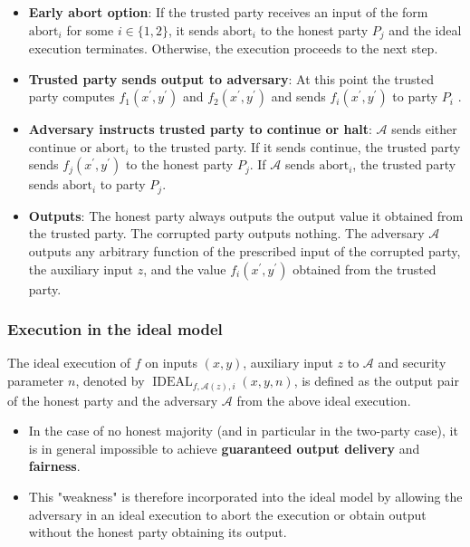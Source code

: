 \documentclass{beamer}
\begin{document}
    \begin{frame}
    
        \begin{definition}
            \begin{itemize}
                \item \textbf{Early abort option}: If the trusted party receives an input of the form $\mathrm{abort}_{i}$ for some $i \in\{1,2\}$, it sends $\mathrm{abort}_{i}$ to the honest party $P_{j}$ and the ideal execution terminates. Otherwise, the execution proceeds to the next step.
                \item \textbf{Trusted party sends output to adversary}: At this point the trusted party computes $f_{1}\left(x^{\prime}, y^{\prime}\right)$ and $f_{2}\left(x^{\prime}, y^{\prime}\right)$ and sends $f_{i}\left(x^{\prime}, y^{\prime}\right)$ to party $P_{i}$ .
                \item \textbf{Adversary instructs trusted party to continue or halt}: $\mathcal{A}$ sends either $\mathrm{continue}$ or $\mathrm{abort}_{i}$ to the trusted party. If it sends $\mathrm{continue}$, the trusted party sends $f_{j}\left(x^{\prime}, y^{\prime}\right)$ to the honest party $P_{j}$. If $\mathcal{A}$ sends $\mathrm{abort}_{i}$, the trusted party sends $\mathrm{abort}_{i}$ to party $P_{j}$.
                \item \textbf{Outputs}: The honest party always outputs the output value it obtained from the trusted party. The corrupted party outputs nothing. The adversary $\mathcal{A}$ outputs any arbitrary function of the prescribed input of the corrupted party, the auxiliary input $z$, and the value $f_{i}\left(x^{\prime}, y^{\prime}\right)$ obtained from the trusted party.

            \end{itemize}
        \end{definition}
    
    \end{frame}
    \begin{frame}
        \frametitle{Execution in the ideal model}
        
        \begin{definition}
            The ideal execution of $f$ on inputs $(x, y)$, auxiliary input $z$ to $\mathcal{A}$ and security parameter $n$, denoted by $\operatorname{IDEAL}_{f, \mathcal{A}(z), i}(x, y, n)$, is defined as the output pair of the honest party and the adversary $\mathcal{A}$ from the above ideal execution.
        \end{definition}

        \begin{itemize}
            \item In the case of no honest majority (and in particular in the two-party case), it is in general impossible to achieve \textbf{guaranteed output delivery} and \textbf{fairness}. 
            \item This "weakness" is therefore incorporated into the ideal model by allowing the adversary in an ideal execution to abort the execution or obtain output without the honest party obtaining its output.
        \end{itemize}
    
    \end{frame}
\end{document}
